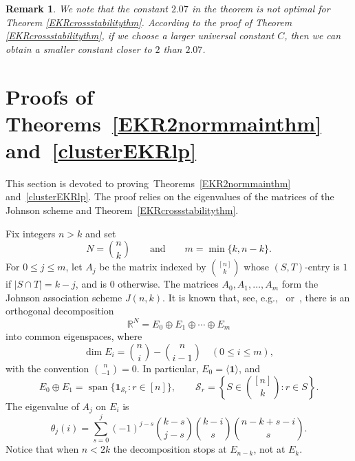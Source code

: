 \documentclass[11pt]{article}
\numberwithin{equation}{section}
\newtheorem{remark}[theorem]{Remark}
\begin{document}
\begin{remark}
We note that the constant $2.07$ in the theorem is not optimal for Theorem \ref{EKRcrossstabilitythm}.
According to the proof of Theorem \ref{EKRcrossstabilitythm},
if we choose a larger universal constant $C$, then we can obtain a smaller constant closer to $2$ than $2.07$.
\end{remark}



\section{Proofs of Theorems~\ref{EKR2normmainthm} and~\ref{clusterEKRlp}}
\label{sec:proof-main}



This section is devoted to proving~Theorems~\ref{EKR2normmainthm} and~\ref{clusterEKRlp}.
The proof relies on the eigenvalues of the matrices
of the Johnson scheme and Theorem~\ref{EKRcrossstabilitythm}.




Fix integers $n>k$ and set
\[
N=\binom{n}{k}
\qquad\text{and}\qquad
m=\min\{k,n-k\}.
\]
For $0\leq j\leq m$, let $A_j$ be the matrix indexed by
$\binom{[n]}{k}$ whose $(S,T)$-entry is $1$ if $|S\cap T|=k-j$, and is
$0$ otherwise.  The matrices $A_0,A_1,\ldots,A_m$ form the Johnson
association scheme $J(n,k)$.
It is known that, see, e.g.,~\cite{Delsarte} or~\cite[Chapter 6]{GodsilEKRbook}, there is an orthogonal decomposition
\[
\mathbb{R}^{N}=E_0\oplus E_1\oplus\cdots\oplus E_m
\]
into common eigenspaces, where
\[
\dim E_i=\binom{n}{i}-\binom{n}{i-1}
\quad (0\leq i\leq m),
\]
with the convention $\binom{n}{-1}=0$.  In particular,
$E_0=\langle\mathbf{1}\rangle$, and
\[
E_0\oplus E_1
=\operatorname{span}\{\mathbf{1}_{\mathcal{S}_r}:r\in[n]\},
\qquad
\mathcal{S}_r=\left\{S\in\binom{[n]}{k}:r\in S\right\}.
\]
The eigenvalue of $A_j$ on $E_i$ is
\[
\theta_j(i)
=\sum_{s=0}^{j}(-1)^{j-s}
\binom{k-s}{j-s}\binom{k-i}{s}
\binom{n-k+s-i}{s}.
\]
Notice that when $n<2k$ the decomposition stops at $E_{n-k}$, not at
$E_k$.
\end{document}
